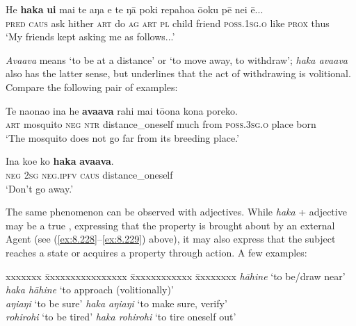 \ea\label{ex:8.244}
\gll He \textbf{haka} \textbf{{\ꞌ}ui} mai te aŋa e te ŋā poki repahoa ō{\ꞌ}oku pē nei ē...\\
\textsc{pred} \textsc{caus} ask hither \textsc{art} do \textsc{ag} \textsc{art} \textsc{pl} child friend \textsc{poss.1sg.o} like \textsc{prox} thus\\

\glt
‘My friends kept asking me as follows...’ \textstyleExampleref{[R380.042]} 
\z

\textit{{\ꞌ}Ava{\ꞌ}ava} means ‘to be at a distance’ or ‘to move away, to withdraw’; \textit{haka {\ꞌ}ava{\ꞌ}ava} also has the latter sense, but underlines that the act of withdrawing is volitional. Compare the following pair of examples:

\ea\label{ex:8.245}
\gll Te naonao {\ꞌ}ina he \textbf{{\ꞌ}ava{\ꞌ}ava} rahi mai tō{\ꞌ}ona kona poreko. \\
\textsc{art} mosquito \textsc{neg} \textsc{ntr} distance\_oneself much from \textsc{poss.3sg.o} place born \\

\glt 
‘The mosquito does not go far from its breeding place.’ \textstyleExampleref{[R535.065]} 
\z

\ea\label{ex:8.246}
\gll {\ꞌ}Ina koe ko \textbf{haka} \textbf{{\ꞌ}ava{\ꞌ}ava}. \\
\textsc{neg} \textsc{2sg} \textsc{neg.ipfv} \textsc{caus} distance\_oneself \\

\glt
‘Don’t go away.’ \textstyleExampleref{[R482.045]} 
\z

The same phenomenon can be observed with adjectives. While \textit{haka} + adjective may be a true , expressing that the property is brought about by an external Agent (see (\ref{ex:8.228}–\ref{ex:8.229}) above), it may also express that the subject reaches a state or acquires a property through  action. A few examples:

\ea\label{ex:8.246a}
\begin{tabbing}
xxxxxxx \= xxxxxxxxxxxxxxxx \= xxxxxxxxxxxx \= xxxxxxxx \kill
\textit{hāhine} \> ‘to be/draw near’ \> \textit{haka hāhine} \> ‘to approach (volitionally)’\\
\textit{aŋiaŋi} \> ‘to be sure’ \> \textit{haka aŋiaŋi} \> ‘to make sure, verify’\\
\textit{rohirohi} \> ‘to be tired’ \> \textit{haka rohirohi} \> ‘to tire oneself out’
\end{tabbing}
\z

